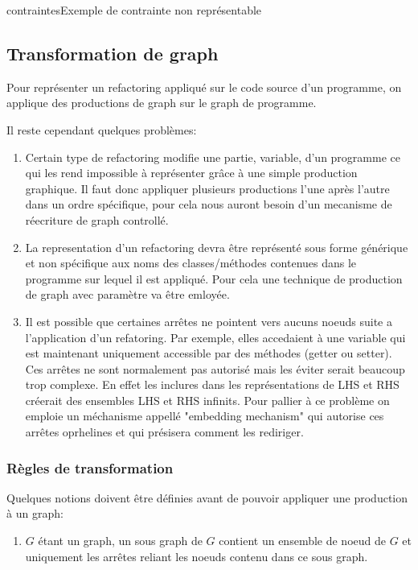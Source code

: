 \documentclass[a4paper, 12pt]{article}
\begin{document}
\begin{figu}{contraintes}{Exemple de contrainte non représentable}
\subsection{Transformation de graph}

Pour représenter un refactoring appliqué sur le code source d'un programme, on applique des productions de graph sur le graph de programme.

Il reste cependant quelques problèmes:

\begin{enumerate}
\item Certain type de refactoring modifie une partie, variable, d'un programme ce qui les rend impossible à représenter grâce à une simple production graphique. Il faut donc appliquer plusieurs productions l'une après l'autre dans un ordre spécifique, pour cela nous auront besoin d'un mecanisme de réecriture de graph controllé.

\item La representation d'un refactoring devra être représenté sous forme générique et non spécifique aux noms des classes/méthodes contenues dans le programme sur lequel il est appliqué. Pour cela une technique de production de graph avec paramètre va être emloyée.

\item Il est possible que certaines arrêtes ne pointent vers aucuns noeuds suite a l'application d'un refatoring. Par exemple, elles accedaient à une variable qui est maintenant uniquement accessible par des méthodes (getter ou setter). Ces arrêtes ne sont normalement pas autorisé mais les éviter serait beaucoup trop complexe. En effet les inclures dans les représentations de LHS et RHS créerait des ensembles LHS et RHS infinits. Pour pallier à ce problème on emploie un méchanisme appellé "embedding mechanism" qui autorise ces arrêtes oprhelines et qui présisera comment les rediriger.
\end{enumerate}

\subsubsection{Règles de transformation}

Quelques notions doivent être définies avant de pouvoir appliquer une production à un graph:

\begin{enumerate}
\item \(G\) étant un graph, un sous graph de \(G\) contient un ensemble de noeud de \(G\) et uniquement les arrêtes reliant les noeuds contenu dans ce sous graph.


\end{enumerate}
\end{figu}
\end{document}
